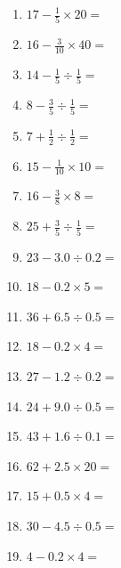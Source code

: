 \documentclass[12pt]{article}
\begin{document}
\begin{enumerate}
\item \large $ 17 - \frac{1}{5} \times 20 = $ \vspace{1.6cm}
\item \large $ 16 - \frac{3}{10} \times 40 = $ \vspace{1.6cm}
\item \large $ 14 - \frac{1}{5} \div \frac{1}{5} = $ \vspace{1.6cm}
\newpage
\item \large $ 8 - \frac{3}{5} \div \frac{1}{5} = $ \vspace{1.6cm}
\item \large $ 7 + \frac{1}{2} \div \frac{1}{2} = $ \vspace{1.6cm}
\item \large $ 15 - \frac{1}{10} \times 10 = $ \vspace{1.6cm}
\item \large $ 16 - \frac{3}{8} \times 8 = $ \vspace{1.6cm}
\item \large $ 25 + \frac{3}{5} \div \frac{1}{5} = $ \vspace{1.6cm}
\item \large $ 23 - 3.0 \div 0.2 = $ \vspace{1.6cm}
\item \large $ 18 - 0.2 \times 5 = $ \vspace{1.6cm}
\item \large $ 36 + 6.5 \div 0.5 = $ \vspace{1.6cm}
\item \large $ 18 - 0.2 \times 4 = $ \vspace{1.6cm}
\item \large $ 27 - 1.2 \div 0.2 = $ \vspace{1.6cm}
\newpage
\item \large $ 24 + 9.0 \div 0.5 = $ \vspace{1.6cm}
\item \large $ 43 + 1.6 \div 0.1 = $ \vspace{1.6cm}
\item \large $ 62 + 2.5 \times 20 = $ \vspace{1.6cm}
\item \large $ 15 + 0.5 \times 4 = $ \vspace{1.6cm}
\item \large $ 30 - 4.5 \div 0.5 = $ \vspace{1.6cm}
\item \large $ 4 - 0.2 \times 4 = $ \vspace{1.6cm}

\end{enumerate}
\end{document}
